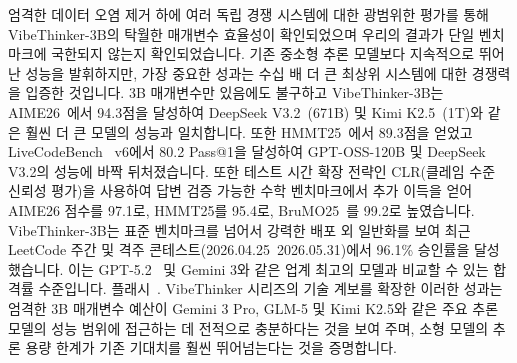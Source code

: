 \documentclass{article}
\begin{document}
엄격한 데이터 오염 제거 하에 여러 독립 경쟁 시스템에 대한 광범위한 평가를 통해 VibeThinker-3B의 탁월한 매개변수 효율성이 확인되었으며 우리의 결과가 단일 벤치마크에 국한되지 않는지 확인되었습니다. 기존 중소형 추론 모델보다 지속적으로 뛰어난 성능을 발휘하지만, 가장 중요한 성과는 수십 배 더 큰 최상위 시스템에 대한 경쟁력을 입증한 것입니다. 3B 매개변수만 있음에도 불구하고 VibeThinker-3B는 AIME26~\cite{maa2026aime}에서 94.3점을 달성하여 DeepSeek V3.2~\cite{liu2025deepseekv3.2}(671B) 및 Kimi K2.5~\cite{team2026kimik2.5}(1T)와 같은 훨씬 더 큰 모델의 성능과 일치합니다. 또한 HMMT25~\cite{hmmt2025}에서 89.3점을 얻었고 LiveCodeBench~\cite{jain2024livecodebench} v6에서 80.2 Pass@1을 달성하여 GPT-OSS-120B 및 DeepSeek V3.2의 성능에 바짝 뒤처졌습니다. 또한 테스트 시간 확장 전략인 CLR(클레임 수준 신뢰성 평가)을 사용하여 답변 검증 가능한 수학 벤치마크에서 추가 이득을 얻어 AIME26 점수를 97.1로, HMMT25를 95.4로, BruMO25~\cite{brumo2025}를 99.2로 높였습니다. VibeThinker-3B는 표준 벤치마크를 넘어서 강력한 배포 외 일반화를 보여 최근 LeetCode 주간 및 격주 콘테스트(2026.04.25~2026.05.31)에서 96.1\% 승인률을 달성했습니다. 이는 GPT-5.2~\cite{openai2025gpt52systemcard} 및 Gemini 3와 같은 업계 최고의 모델과 비교할 수 있는 합격률 수준입니다. 플래시~\cite{googledeepmind2025gemini3flashmodelcard}.
VibeThinker 시리즈의 기술 계보를 확장한 이러한 성과는 엄격한 3B 매개변수 예산이 Gemini 3 Pro, GLM-5 및 Kimi K2.5와 같은 주요 추론 모델의 성능 범위에 접근하는 데 전적으로 충분하다는 것을 보여 주며, 소형 모델의 추론 용량 한계가 기존 기대치를 훨씬 뛰어넘는다는 것을 증명합니다.


\end{document}
